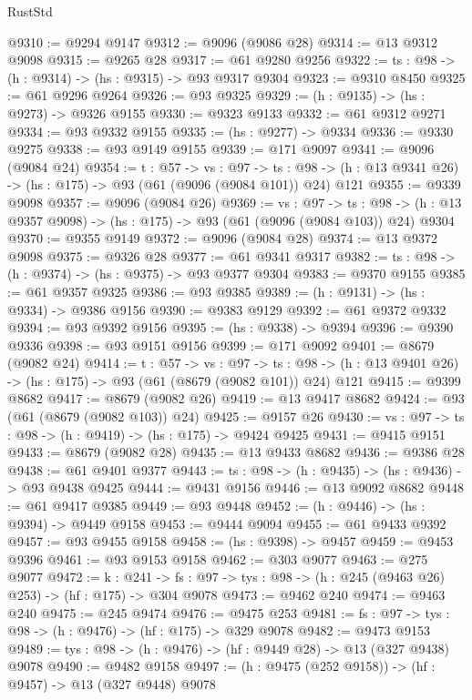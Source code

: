 \begin{lexlean}{RustStd}
\begin{coremodule}
@9310 := @9294 @9147
@9312 := @9096 (@9086 @28)
@9314 := @13 @9312 @9098
@9315 := @9265 @28
@9317 := @61 @9280 @9256
@9322 := {ts : @98} -> (h : @9314) -> (hs : @9315) -> @93 @9317 @9304
@9323 := @9310 @8450
@9325 := @61 @9296 @9264
@9326 := @93 @9325
@9329 := (h : @9135) -> (hs : @9273) -> @9326 @9155
@9330 := @9323 @9133
@9332 := @61 @9312 @9271
@9334 := @93 @9332 @9155
@9335 := (hs : @9277) -> @9334
@9336 := @9330 @9275
@9338 := @93 @9149 @9155
@9339 := @171 @9097
@9341 := @9096 (@9084 @24)
@9354 := {t : @57} ->
  {vs : @97} ->
  {ts : @98} -> (h : @13 @9341 @26) -> (hs : @175) -> @93 (@61 (@9096 (@9084 @101)) @24) @121
@9355 := @9339 @9098
@9357 := @9096 (@9084 @26)
@9369 := {vs : @97} ->
  {ts : @98} -> (h : @13 @9357 @9098) -> (hs : @175) -> @93 (@61 (@9096 (@9084 @103)) @24) @9304
@9370 := @9355 @9149
@9372 := @9096 (@9084 @28)
@9374 := @13 @9372 @9098
@9375 := @9326 @28
@9377 := @61 @9341 @9317
@9382 := {ts : @98} -> (h : @9374) -> (hs : @9375) -> @93 @9377 @9304
@9383 := @9370 @9155
@9385 := @61 @9357 @9325
@9386 := @93 @9385
@9389 := (h : @9131) -> (hs : @9334) -> @9386 @9156
@9390 := @9383 @9129
@9392 := @61 @9372 @9332
@9394 := @93 @9392 @9156
@9395 := (hs : @9338) -> @9394
@9396 := @9390 @9336
@9398 := @93 @9151 @9156
@9399 := @171 @9092
@9401 := @8679 (@9082 @24)
@9414 := {t : @57} ->
  {vs : @97} ->
  {ts : @98} -> (h : @13 @9401 @26) -> (hs : @175) -> @93 (@61 (@8679 (@9082 @101)) @24) @121
@9415 := @9399 @8682
@9417 := @8679 (@9082 @26)
@9419 := @13 @9417 @8682
@9424 := @93 (@61 (@8679 (@9082 @103)) @24)
@9425 := @9157 @26
@9430 := {vs : @97} -> {ts : @98} -> (h : @9419) -> (hs : @175) -> @9424 @9425
@9431 := @9415 @9151
@9433 := @8679 (@9082 @28)
@9435 := @13 @9433 @8682
@9436 := @9386 @28
@9438 := @61 @9401 @9377
@9443 := {ts : @98} -> (h : @9435) -> (hs : @9436) -> @93 @9438 @9425
@9444 := @9431 @9156
@9446 := @13 @9092 @8682
@9448 := @61 @9417 @9385
@9449 := @93 @9448
@9452 := (h : @9446) -> (hs : @9394) -> @9449 @9158
@9453 := @9444 @9094
@9455 := @61 @9433 @9392
@9457 := @93 @9455 @9158
@9458 := (hs : @9398) -> @9457
@9459 := @9453 @9396
@9461 := @93 @9153 @9158
@9462 := @303 @9077
@9463 := @275 @9077
@9472 := {k : @241} ->
  {fs : @97} -> {tys : @98} -> (h : @245 (@9463 @26) @253) -> (hf : @175) -> @304 @9078
@9473 := @9462 @240
@9474 := @9463 @240
@9475 := @245 @9474
@9476 := @9475 @253
@9481 := {fs : @97} -> {tys : @98} -> (h : @9476) -> (hf : @175) -> @329 @9078
@9482 := @9473 @9153
@9489 := {tys : @98} -> (h : @9476) -> (hf : @9449 @28) -> @13 (@327 @9438) @9078
@9490 := @9482 @9158
@9497 := (h : @9475 (@252 @9158)) -> (hf : @9457) -> @13 (@327 @9448) @9078

\end{coremodule}
\end{lexlean}
